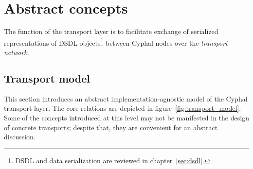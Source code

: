 \section{Abstract concepts}

The function of the transport layer is to facilitate exchange of serialized representations of DSDL objects\footnote{%
    DSDL and data serialization are reviewed in chapter~\ref{sec:dsdl}.
} between Cyphal nodes over the \emph{transport network}.

\subsection{Transport model}\label{sec:transport_model}

This section introduces an abstract implementation-agnostic model of the Cyphal transport layer.
The core relations are depicted in figure~\ref{fig:transport_model}.
Some of the concepts introduced at this level may not be manifested in the design of concrete transports;
despite that, they are convenient for an abstract discussion.

